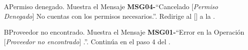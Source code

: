 \begin{UCtrayectoriaA}{A}{Permiso denegado.}
			\UCpaso Muestra el Mensaje {\bf MSG04-}``Cancelado [{\em Permiso Denegado}] No cuentas con los permisos necesarios.''.
			\UCpaso Redirige al [\UCactor] a la  .
		\end{UCtrayectoriaA}

\begin{UCtrayectoriaA}{B}{Proveedor no encontrado.}
			\UCpaso Muestra el Mensaje {\bf MSG01-}``Error en la Operación [{\em Proveedor no encontrado}]  .''.
			\UCpaso Continúa en el paso 4 del .
		\end{UCtrayectoriaA}
